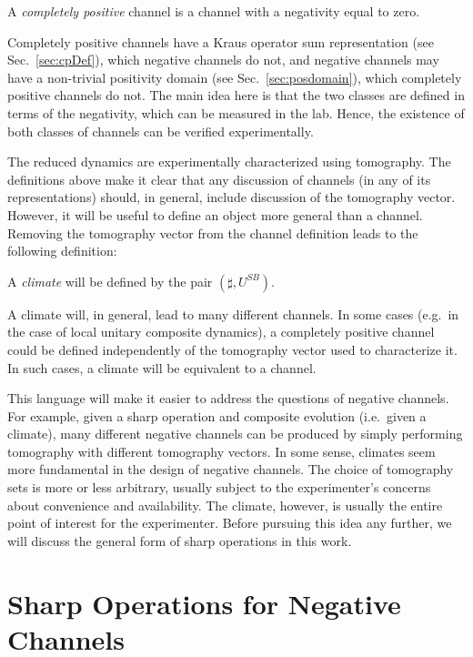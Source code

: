 \begin{definition}
A {\em completely positive} channel is a channel with a negativity equal to zero.  
\end{definition}  

Completely positive channels have a Kraus operator sum representation (see Sec.\ \ref{sec:cpDef}), which negative channels do not, and negative channels may have a non-trivial positivity domain (see Sec.\ \ref{sec:posdomain}), which completely positive channels do not.  The main idea here is that the two classes are defined in terms of the negativity, which can be measured in the lab.  Hence, the existence of both classes of channels can be verified experimentally.  

The reduced dynamics are experimentally characterized using tomography.  The definitions above make it clear that any discussion of channels (in any of its representations) should, in general, include discussion of the tomography vector.  However, it will be useful to define an object more general than a channel.  Removing the tomography vector from the channel definition leads to the following definition:

\begin{definition}
A {\em climate} will be defined by the pair $(\sharp,U^{SB})$.
\end{definition}

A climate will, in general, lead to many different channels.  In some cases (e.g.\ in the case of local unitary composite dynamics), a completely positive channel could be defined independently of the tomography vector used to characterize it.  In such cases, a climate will be equivalent to a channel.

This language will make it easier to address the questions of negative channels.  For example, given a sharp operation and composite evolution (i.e.\ given a climate), many different negative channels can be produced by simply performing tomography with different tomography vectors.  In some sense, climates seem more fundamental in the design of negative channels.  The choice of tomography sets is more or less arbitrary, usually subject to the experimenter's concerns about convenience and availability.  The climate, however, is usually the entire point of interest for the experimenter.  Before pursuing this idea any further, we will discuss the general form of sharp operations in this work.
  
\section{Sharp Operations for Negative Channels}
\label{sec:negsharpop}

